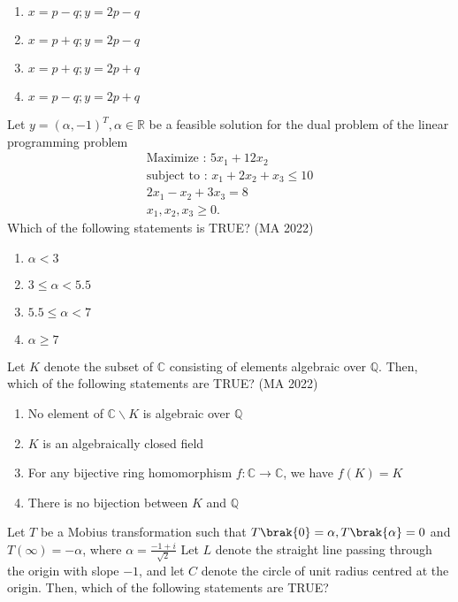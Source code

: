 \begin{enumerate}
\item $x=p-q; y=2p-q$
\item $x=p+q; y=2p-q$
\item $x=p+q; y=2p+q$
\item $x=p-q; y=2p+q$
\end{enumerate}
\item Let $y = (\alpha,-1)^T , \alpha \in \mathbb{R}$ be a feasible solution for the dual problem of the linear
programming problem
\begin{align}
\text{Maximize : } 5x_1 + 12x_2 \\
\text{subject to : } x_1+2x_2+x_3 \leq 10 \\
2x_1-x_2+3x_3 = 8 \\
x_1,x_2,x_3 \geq 0.
\end{align}
Which of the following statements is TRUE?
\hfill{(MA 2022)}
\begin{multicols}{4}
\begin{enumerate}

\item $\alpha < 3$
\item $3 \leq \alpha < 5.5$
\item $5.5 \leq \alpha < 7$
\item $\alpha \geq 7$
\end{enumerate}
\end{multicols}
\item Let $K$ denote the subset of $\mathbb{C}$ consisting of elements algebraic over $\mathbb{Q}$. Then, which
of the following statements are TRUE?
\hfill{(MA 2022)}
\begin{enumerate}
\item No element of $\mathbb{C}\backslash K$ is algebraic over $\mathbb{Q}$
\item $K$ is an algebraically closed field
\item For any bijective ring homomorphism $f : \mathbb{C} \rightarrow \mathbb{C} $, we have $f(K)=K$
\item There is no bijection between $K$ and $\mathbb{Q}$
\end{enumerate}
\item Let $T$ be a Mobius transformation such that $T\brak{0}=\alpha,T\brak{\alpha}=0$ and $T(\infty)=-\alpha $, where $\alpha = \frac{-1+i}{\sqrt{2}}$ Let $L$ denote the straight line passing through the origin with slope  $-1$, and let $C$ denote the circle of unit radius centred at the origin. Then, which of the following statements are TRUE?
